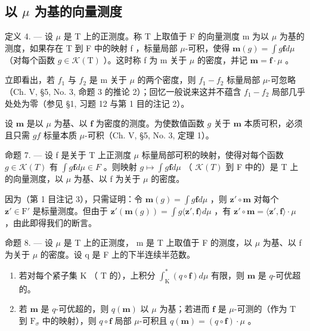 \subsection{\texorpdfstring{以 \(\mu\) 为基的向量测度}{以 mu 为基的向量测度}}

定义 4. --- 设 \(\mu\) 是 T 上的正测度。称 T 上取值于 F 的向量测度 m 为以 \(\mu\) 为基的测度，如果存在 T 到 F 中的映射 f ，标量局部 \(\mu\)-可积，使得 \(\mathbf{m}(g) = \int g\mathbf{f}d\mu\) （对每个函数 \(g \in \mathcal{K}(\mathrm{T})\) ）。这时称 f 为 m 关于 \(\mu\) 的密度，并记 \(\mathbf{m} = \mathbf{f} \cdot \mu\) 。

立即看出，若 \(f_{1}\) 与 \(f_{2}\) 是 m 关于 \(\mu\) 的两个密度，则 \(f_{1}-f_{2}\) 标量局部 \(\mu\)-可忽略（Ch. V, §5, No. 3, 命题 3 的推论 2）；回忆一般说来这并不蕴含 \(f_{1}-f_{2}\) 局部几乎处处为零（参见 §1, 习题 12 与第 1 目的注记 2）。

设 \(\mathbf{m}\) 是以 \(\mu\) 为基、以 \(\mathbf{f}\) 为密度的测度。为使数值函数 \(g\) 关于 \(\mathbf{m}\) 本质可积，必须且只需 \(gf\) 标量本质 \(\mu\)-可积（Ch. V, §5, No. 3, 定理 1）。

命题 7. --- 设 f 是关于 T 上正测度 \(\mu\) 标量局部可积的映射，使得对每个函数 \(g \in \mathcal{K}(T)\) 有 \(\int g\mathbf{f} d\mu \in F\) 。则映射 \(g \mapsto \int g\mathbf{f} d\mu\) （ \(\mathcal{K}(T)\) 到 F 中的）是 T 上的向量测度，以 \(\mu\) 为基、以 f 为关于 \(\mu\) 的密度。

因为（第 1 目注记 3），只需证明：令 \(\mathbf{m}(g) = \int g\mathbf{f}d\mu\) ，则 \(\mathbf{z}' \circ \mathbf{m}\) 对每个 \(\mathbf{z}' \in \mathrm{F}'\) 是标量测度。但由于 \(\mathbf{z}'(\mathbf{m}(g)) = \int g\langle \mathbf{z}', \mathbf{f} \rangle d\mu\) ，有 \(\mathbf{z}' \circ \mathbf{m} = \langle \mathbf{z}', \mathbf{f} \rangle \cdot \mu\) ，由此即得我们的断言。

命题 8. --- 设 \(\mu\) 是 T 上的正测度， m 是 T 上取值于 F 的测度，以 \(\mu\) 为基、以 f 为关于 \(\mu\) 的密度。设 q 是 F 上的下半连续半范数。

\begin{enumerate}
\def\labelenumi{\alph{enumi})}
\item
  若对每个紧子集 \(\mathrm{K}\) （ \(\mathrm{T}\) 的），上积分 \(\int_{\mathrm{K}}^{*}(q \circ \mathbf{f}) d\mu\) 有限，则 \(\mathbf{m}\) 是 \(q\)-可优超的。
\item
  若 \(\mathbf{m}\) 是 \(q\)-可优超的，则 \(q(\mathbf{m})\) 以 \(\mu\) 为基；若进而 \(\mathbf{f}\) 是 \(\mu\)-可测的（作为 \(\mathrm{T}\) 到 \(\mathrm{F}_{\sigma}\) 中的映射），则 \(q \circ \mathbf{f}\) 局部 \(\mu\)-可积且 \(q(\mathbf{m}) = (q \circ \mathbf{f}) \cdot \mu\) 。
\end{enumerate}

